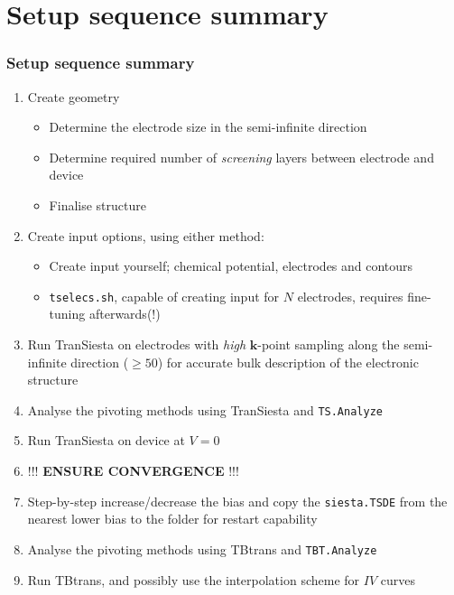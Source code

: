 \section{Setup sequence summary}

\begin{frame}
  \frametitle{Setup sequence summary}

  \begin{enumerate}%

    \item Create geometry
    \begin{itemize}
      \item Determine the electrode size in the semi-infinite direction

      \item Determine required number of \emph{screening} layers between electrode and device
      \item Finalise structure
    \end{itemize}

    \item Create input options, using either method:
    \begin{itemize}
      \item Create input yourself; chemical potential, electrodes and contours


      \item \texttt{tselecs.sh}, capable of creating input for $N$ electrodes, requires
      fine-tuning afterwards(!)

    \end{itemize}

    \item Run TranSiesta on electrodes with \emph{high} $\mathbf k$-point sampling along
    the semi-infinite direction ($\ge50$)
    for accurate bulk description of the electronic structure

    \item Analyse the pivoting methods using TranSiesta and \texttt{TS.Analyze}

    \item Run TranSiesta on device at $V=0$

    \item !!! \textbf{ENSURE CONVERGENCE} !!!

    \item Step-by-step increase/decrease the bias and copy the \texttt{siesta.TSDE} from
    the nearest lower bias to the folder for restart capability

    \item Analyse the pivoting methods using TBtrans and \texttt{TBT.Analyze}

    \item Run TBtrans, and possibly use the interpolation scheme for $IV$ curves

  \end{enumerate}

\end{frame}

